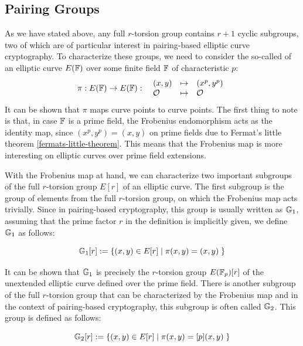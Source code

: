 \subsection{Pairing Groups}
\label{sec:pairing_groups}
 As we have stated above, any full $r$-torsion group contains $r+1$ cyclic subgroups, two of which are of particular interest in pairing-based elliptic curve cryptography. To characterize these groups, we need to consider the so-called  of an elliptic curve $E(\mathbb{F})$ over some finite field $\mathbb{F}$ of characteristic $p$:
\begin{equation}\label{eq:frobenius-enomorphism}
\pi : E(\mathbb{F}) \to E(\mathbb{F}): \;\; 
\begin{array}{lcl}
(x,y)       &\mapsto & (x^p,y^p)\\
\mathcal{O} &\mapsto & \mathcal{O}
\end{array} 
\end{equation}
It can be shown that $\pi$ maps curve points to curve points. The first thing to note is that, in case  $\mathbb{F}$ is a prime field, the Frobenius endomorphism acts as the identity map, since $(x^p,y^p) = (x,y)$ on prime fields due to Fermat's little theorem \ref{fermats-little-theorem}. This means that the Frobenius map is more interesting on elliptic curves over prime field extensions.

With the Frobenius map at hand, we can characterize two important subgroups of the full $r$-torsion group $E[r]$ of an elliptic curve. The first subgroup is the group of elements from the full $r$-torsion group, on which the Frobenius map acts trivially. Since in pairing-based cryptography, this group is usually written as $\mathbb{G}_1$, assuming that the prime factor $r$ in the definition is implicitly given, we define $\mathbb{G}_1$ as follows:

\begin{equation}
\label{def:pairing_group_G1}
\mathbb{G}_1[r] := \{(x,y)\in E[r]\;|\; \pi(x,y) = (x,y)\;\}
\end{equation}

It can be shown that $\mathbb{G}_1$ is precisely the $r$-torsion group $E(\mathbb{F}_p)[r]$ of the unextended elliptic curve defined over the prime field. There is another subgroup of the full $r$-torsion group that can be characterized by the Frobenius map and in the context of pairing-based cryptography, this subgroup is often called $\mathbb{G}_2$. This group is defined as follows:

\begin{equation}
\label{def:pairing_group_G2}
\mathbb{G}_2[r]:= \{(x,y)\in E[r]\;|\; \pi(x,y) = [p](x,y)\;\}
\end{equation}

